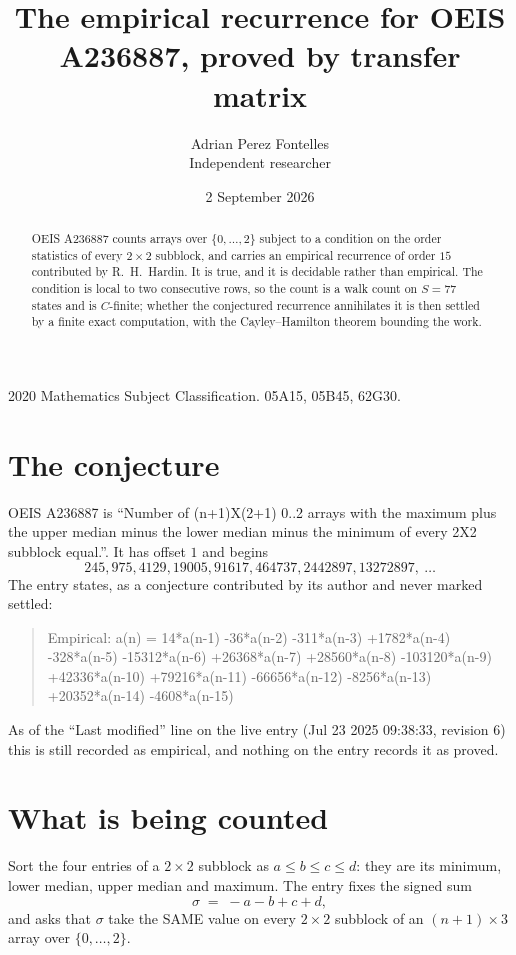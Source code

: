 \documentclass[11pt,a4paper]{article}
\title{The empirical recurrence for OEIS A236887, proved by transfer matrix}
\author{Adrian Perez Fontelles\\ \small Independent researcher}
\date{2 September 2026}
\theoremstyle{plain}
\theoremstyle{definition}
\begin{document}
\maketitle

\begin{abstract}
OEIS A236887 counts arrays over $\{0,\dots,2\}$ subject to a condition on the order
statistics of every $2\times2$ subblock, and carries an empirical recurrence of order
$15$ contributed by R.~H.~Hardin. It is true, and it is decidable rather than empirical.
The condition is local to two consecutive rows, so the count is a walk count on $S=77$
states and is $C$-finite; whether the conjectured recurrence annihilates it is then settled by
a finite exact computation, with the Cayley--Hamilton theorem bounding the work.
\end{abstract}

\noindent\small 2020 Mathematics Subject Classification. 05A15, 05B45, 62G30.\normalsize

\section{The conjecture}

OEIS A236887 is ``Number of (n+1)X(2+1) 0..2 arrays with the maximum plus the upper median minus the lower median minus the minimum of every 2X2 subblock equal.''. It has offset $1$ and begins
\[
245, 975, 4129, 19005, 91617, 464737, 2442897, 13272897,\ \dots
\]
The entry states, as a conjecture contributed by its author and never marked settled:
\begin{quote}
Empirical: a(n) = 14*a(n-1) -36*a(n-2) -311*a(n-3) +1782*a(n-4) -328*a(n-5) -15312*a(n-6) +26368*a(n-7) +28560*a(n-8) -103120*a(n-9) +42336*a(n-10) +79216*a(n-11) -66656*a(n-12) -8256*a(n-13) +20352*a(n-14) -4608*a(n-15)
\end{quote}
As of the ``Last modified'' line on the live entry (Jul 23 2025 09:38:33, revision 6) this is still
recorded as empirical, and nothing on the entry records it as proved.

\section{What is being counted}

Sort the four entries of a $2\times2$ subblock as $a\le b\le c\le d$: they
are its minimum, lower median, upper median and maximum. The entry fixes the signed sum
\[
\sigma\;=\;-a-b+c+d,
\]
and asks that $\sigma$ take the SAME value on every $2\times2$ subblock of an
$(n+1)\times3$ array over $\{0,\dots,2\}$.
\end{document}
